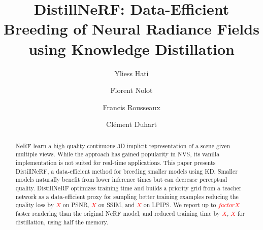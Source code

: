 \documentclass[sigconf]{acmart}
\newcommand{\toDo}[1]{\textcolor{red}{#1}}
\begin{document}
\title{DistillNeRF: Data-Efficient Breeding of Neural Radiance Fields using Knowledge Distillation}

\author{Yliess Hati}

\author{Florent Nolot}

\author{Francis Rousseaux}
    
\author{Clément Duhart}

\renewcommand\shortauthors{Hati et al}


\begin{abstract}
\gls{NeRF} learn a high-quality continuous 3D implicit representation of a scene given multiple views. While the approach has gained popularity in \gls{NVS}, its vanilla implementation is not suited for real-time applications. This paper presents DistillNeRF, a data-efficient method for breeding smaller models using \gls{KD}. Smaller models naturally benefit from lower inference times but can decrease perceptual quality. DistillNeRF optimizes training time and builds a priority grid from a teacher network as a data-efficient proxy for sampling better training examples reducing the quality loss by \toDo{$X$} on PSNR, \toDo{$X$} on SSIM, and \toDo{$X$} on LPIPS. We report up to \toDo{$factorX$} faster rendering than the original NeRF model, and reduced training time by \toDo{$X$}, \toDo{$X$} for distillation, using half the memory.
\end{abstract}
\end{document}
